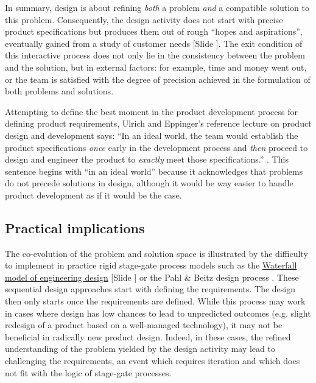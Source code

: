 \documentclass{article}
\newcounter{slide}
\begin{document}
In summary, design is about refining \emph{both} a problem \emph{and} a compatible solution to this problem. Consequently, the design activity does not start with precise product specifications but produces them out of rough ``hopes and aspirations'', eventually gained from a study of customer needs \cite[p. 73]{ulrichProductDesignDevelopment2011} {\color{blue}[Slide ]}. The exit condition of this interactive process does not only lie in the consistency between the problem and the solution, but in external factors: for example, time and money went out, or the team is satisfied with the degree of precision achieved in the formulation of both problems and solutions. 

Attempting to define the best moment in the product development process for defining product requirements, Ulrich and Eppinger's reference lecture on product design and development says: ``In an ideal world, the team would establish the product specifications \emph{once} early in the development process and \emph{then} proceed to design and engineer the product to \emph{exactly} meet those specifications.'' \cite[p. 73, emphases are not in the original text]{ulrichProductDesignDevelopment2011}. This sentence begins with ``in an ideal world'' because it acknowledges that problems do not precede solutions in design, although it would be way easier to handle product development as if it would be the case. 


\subsection{Practical implications}
\label{sec:practicalimplications}

The co-evolution of the problem and solution space is illustrated by the difficulty to implement in practice rigid stage-gate process models such as the \href{https://en.wikipedia.org/wiki/Waterfall\_model}{Waterfall model of engineering design} {\color{blue}[Slide ]} or the Pahl \& Beitz design process \cite{pahlEngineeringDesignSystematic2007}. These sequential design approaches start with defining the requirements. The design then only starts once the requirements are defined. While this process may work in cases where design has low chances to lead to unpredicted outcomes (e.g. slight redesign of a product based on a well-managed technology), it may not be beneficial in radically new product design. Indeed, in these cases, the refined understanding of the problem yielded by the design activity may lead to challenging the requirements, an event which requires iteration and which does not fit with the logic of stage-gate processes.
\end{document}
